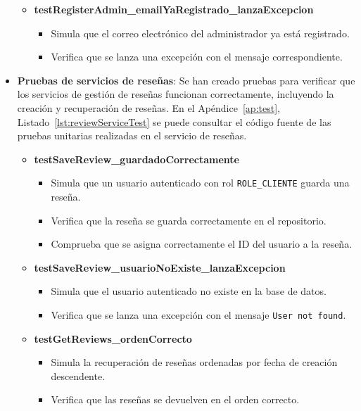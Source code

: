 \begin{itemize}
\begin{itemize}
        \item \textbf{testRegisterAdmin\_emailYaRegistrado\_lanzaExcepcion}
          \begin{itemize}
            \item Simula que el correo electrónico del administrador ya está registrado.
            \item Verifica que se lanza una excepción con el mensaje correspondiente.
          \end{itemize}
    \end{itemize}
    \item \textbf{Pruebas de servicios de reseñas}: Se han creado pruebas para verificar que los servicios de gestión de reseñas funcionan correctamente, incluyendo la creación y recuperación de reseñas.  En el Apéndice~\ref{ap:test}, Listado~\ref{lst:reviewServiceTest} se puede consultar el código fuente de las pruebas unitarias realizadas en el servicio de reseñas.
     \begin{itemize}
      \item \textbf{testSaveReview\_guardadoCorrectamente}
      \begin{itemize}
        \item Simula que un usuario autenticado con rol \texttt{ROLE\_CLIENTE} guarda una reseña.
        \item Verifica que la reseña se guarda correctamente en el repositorio.
        \item Comprueba que se asigna correctamente el ID del usuario a la reseña.
      \end{itemize}

      \item \textbf{testSaveReview\_usuarioNoExiste\_lanzaExcepcion}
      \begin{itemize}
        \item Simula que el usuario autenticado no existe en la base de datos.
        \item Verifica que se lanza una excepción con el mensaje \texttt{User not found}.
      \end{itemize}

      \item \textbf{testGetReviews\_ordenCorrecto}
      \begin{itemize}
        \item Simula la recuperación de reseñas ordenadas por fecha de creación descendente.
        \item Verifica que las reseñas se devuelven en el orden correcto.
      \end{itemize}
    \end{itemize}


\end{itemize}
